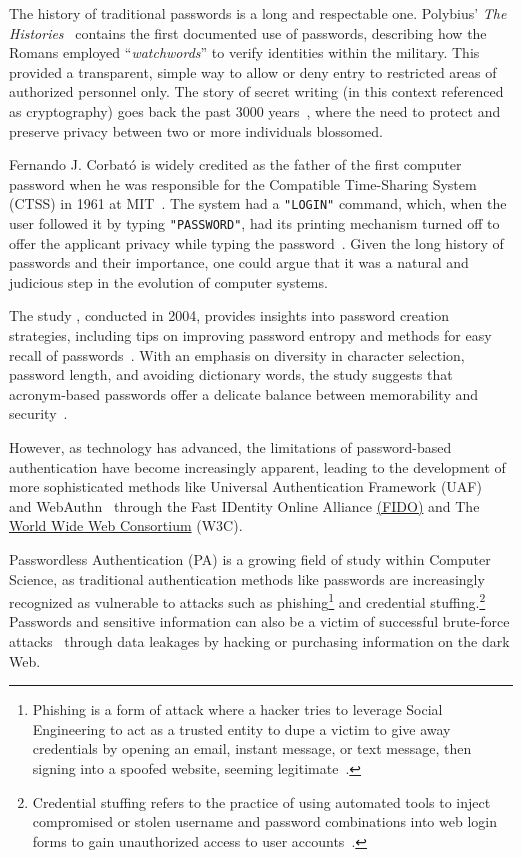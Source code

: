 
The history of traditional passwords is a long and respectable one.
Polybius' \textit{The Histories}~\cite{perseus_tufts} contains the first
documented use of passwords, describing how the Romans employed
``\textit{watchwords}'' to verify identities within the military.
This provided a transparent, simple way to allow or deny entry to restricted
areas of authorized personnel only.
The story of secret writing (in this context referenced as cryptography) goes
back the past 3000 years~\cite{history_cryptography_cryptanalysis}, where the
need to protect and preserve privacy between two or more individuals blossomed.

Fernando J. Corbató is widely credited as the father of the first
computer password when he was responsible for the Compatible Time-Sharing
System (CTSS) in 1961 at MIT~\cite{levy1984hackers}.
The system had a \texttt{"LOGIN"} command, which, when the user followed it by
typing \texttt{"PASSWORD"}, had its printing mechanism turned off to offer
the applicant privacy while typing the password~\cite{ctss_programmers_guide}.
Given the long history of passwords and their importance, one could argue that
it was a natural and judicious step in the evolution of computer systems.

The study , conducted in
2004, provides insights into password creation strategies, including tips on
improving password entropy and methods for easy recall of passwords~\cite{
  yan2000password}.
With an emphasis on diversity in character selection, password length, and
avoiding dictionary words, the study suggests that acronym-based passwords offer
a delicate balance between memorability and security~\cite{yan2000password}.

However, as technology has advanced, the limitations of password-based
authentication have become increasingly apparent, leading to the development of
more sophisticated methods like Universal Authentication Framework
(UAF)~\cite{fido_uaf_overview} and WebAuthn~\cite{webauthn_level_2} through the
Fast IDentity Online Alliance \href{https://fidoalliance.org}{(FIDO)} and
The \href{https://www.w3.org}{World Wide Web Consortium} (W3C).

Passwordless Authentication (PA) is a growing field of study within Computer
Science, as traditional authentication methods like passwords are increasingly
recognized as vulnerable to attacks such as phishing\footnote{
  Phishing is a form of attack where a hacker tries to leverage Social
  Engineering to act as a trusted entity to dupe a victim to give away
  credentials by opening an email, instant message, or text message, then
  signing into a spoofed website, seeming legitimate~\cite{ripa2021emergence}.
} and credential stuffing.\footnote{
  Credential stuffing refers to the practice of using automated tools to
  inject compromised or stolen username and password combinations into web login
  forms to gain unauthorized access to user
  accounts~\cite{owasp-credential-stuffing}.
}
Passwords and sensitive information can also be a victim of successful
brute-force attacks~\cite{bonneau2012science} through data leakages by hacking
or purchasing information on the dark Web.


